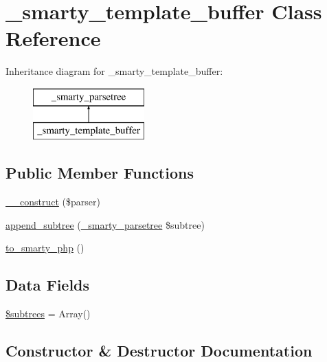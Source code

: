 \hypertarget{class__smarty__template__buffer}{}\section{\+\_\+smarty\+\_\+template\+\_\+buffer Class Reference}
\label{class__smarty__template__buffer}
Inheritance diagram for \+\_\+smarty\+\_\+template\+\_\+buffer\+:\begin{figure}[H]
\begin{center}
\leavevmode
\includegraphics[height=2.000000cm]{class__smarty__template__buffer}
\end{center}
\end{figure}
\subsection*{Public Member Functions}
\begin{DoxyCompactItemize}
\item 
\hyperlink{class__smarty__template__buffer_ab890968dc291758f2315ad508db516b6}{\+\_\+\+\_\+construct} (\$parser)
\item 
\hyperlink{class__smarty__template__buffer_a7a349272fdd157bd4aff78fc72a82293}{append\+\_\+subtree} (\hyperlink{class__smarty__parsetree}{\+\_\+smarty\+\_\+parsetree} \$subtree)
\item 
\hyperlink{class__smarty__template__buffer_a22e90607877f31ace864587efcf8ed28}{to\+\_\+smarty\+\_\+php} ()
\end{DoxyCompactItemize}
\subsection*{Data Fields}
\begin{DoxyCompactItemize}
\item 
\hyperlink{class__smarty__template__buffer_a57499dece2183f4658f0af70515a965c}{\$subtrees} = Array()
\end{DoxyCompactItemize}


\subsection{Constructor \& Destructor Documentation}
\hypertarget{class__smarty__template__buffer_ab890968dc291758f2315ad508db516b6}{}
